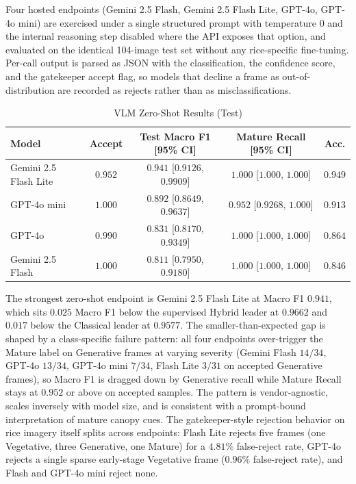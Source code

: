 Four hosted endpoints (Gemini 2.5 Flash, Gemini 2.5 Flash Lite, GPT-4o, GPT-4o mini) are exercised under a single structured prompt with temperature 0 and the internal reasoning step disabled where the API exposes that option, and evaluated on the identical 104-image test set without any rice-specific fine-tuning. Per-call output is parsed as JSON with the classification, the confidence score, and the gatekeeper accept flag, so models that decline a frame as out-of-distribution are recorded as rejects rather than as misclassifications.

\begin{table}[H]
    \centering
    \caption{VLM Zero-Shot Results (Test)}
    \label{tab:test-vlm}
    \footnotesize
    \setlength{\tabcolsep}{4pt}
    \renewcommand{\arraystretch}{1.15}
    \begin{tabular}{@{}lcccc@{}}
        \hline
        Model & Accept & Test Macro F1 [95\% CI] & Mature Recall [95\% CI] & Acc. \\
        \hline
        Gemini 2.5 Flash Lite & $0.952$ & $\mathbf{0.941}$ [$0.9126$, $0.9909$] & $1.000$ [$1.000$, $1.000$] & $0.949$ \\
        GPT-4o mini           & $1.000$ & $0.892$ [$0.8649$, $0.9637$]          & $0.952$ [$0.9268$, $1.000$] & $0.913$ \\
        GPT-4o                & $0.990$ & $0.831$ [$0.8170$, $0.9349$]          & $1.000$ [$1.000$, $1.000$] & $0.864$ \\
        Gemini 2.5 Flash      & $1.000$ & $0.811$ [$0.7950$, $0.9180$]          & $1.000$ [$1.000$, $1.000$] & $0.846$ \\
        \hline
    \end{tabular}
\end{table}

The strongest zero-shot endpoint is Gemini 2.5 Flash Lite at Macro F1 $0.941$, which sits $0.025$ Macro F1 below the supervised Hybrid leader at $0.9662$ and $0.017$ below the Classical leader at $0.9577$. The smaller-than-expected gap is shaped by a class-specific failure pattern: all four endpoints over-trigger the Mature label on Generative frames at varying severity (Gemini Flash $14/34$, GPT-4o $13/34$, GPT-4o mini $7/34$, Flash Lite $3/31$ on accepted Generative frames), so Macro F1 is dragged down by Generative recall while Mature Recall stays at $0.952$ or above on accepted samples. The pattern is vendor-agnostic, scales inversely with model size, and is consistent with a prompt-bound interpretation of mature canopy cues. The gatekeeper-style rejection behavior on rice imagery itself splits across endpoints: Flash Lite rejects five frames (one Vegetative, three Generative, one Mature) for a $4.81\%$ false-reject rate, GPT-4o rejects a single sparse early-stage Vegetative frame ($0.96\%$ false-reject rate), and Flash and GPT-4o mini reject none.

